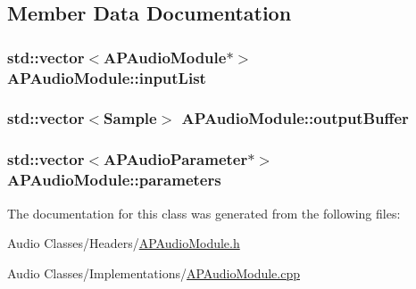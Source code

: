 \subsection{Member Data Documentation}
\hypertarget{class_a_p_audio_module_ac702040bf8bdbd10a838e69e2e52845b}{
\subsubsection[{input\+List}]{\setlength{\rightskip}{0pt plus 5cm}std\+::vector$<${\bf A\+P\+Audio\+Module}$\ast$$>$ A\+P\+Audio\+Module\+::input\+List}}\label{class_a_p_audio_module_ac702040bf8bdbd10a838e69e2e52845b}
\hypertarget{class_a_p_audio_module_a0f04ade4003f1ba68bd1860306d64ffd}{
\subsubsection[{output\+Buffer}]{\setlength{\rightskip}{0pt plus 5cm}std\+::vector$<${\bf Sample}$>$ A\+P\+Audio\+Module\+::output\+Buffer}}\label{class_a_p_audio_module_a0f04ade4003f1ba68bd1860306d64ffd}
\hypertarget{class_a_p_audio_module_a87a79681a3f815fa989a03e1f72721a6}{
\subsubsection[{parameters}]{\setlength{\rightskip}{0pt plus 5cm}std\+::vector$<${\bf A\+P\+Audio\+Parameter}$\ast$$>$ A\+P\+Audio\+Module\+::parameters}}\label{class_a_p_audio_module_a87a79681a3f815fa989a03e1f72721a6}


The documentation for this class was generated from the following files\+:\begin{DoxyCompactItemize}
\item 
Audio Classes/\+Headers/\hyperlink{_a_p_audio_module_8h}{A\+P\+Audio\+Module.\+h}\item 
Audio Classes/\+Implementations/\hyperlink{_a_p_audio_module_8cpp}{A\+P\+Audio\+Module.\+cpp}\end{DoxyCompactItemize}
